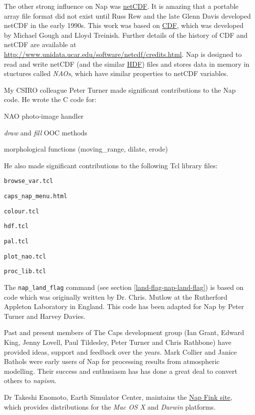 The other strong influence on Nap was 
  \href{http://www.unidata.ucar.edu/packages/netcdf/index.html}{netCDF}.
  It is amazing that a portable array file format did not exist until
  Russ Rew and the late Glenn Davis developed netCDF in the early
  1990s. This work was based on 
  \href{http://nssdc.gsfc.nasa.gov/cdf/cdf-home.html}{CDF}, which
  was developed by Michael Gough and Lloyd Treinish. 
Further details of the history of CDF and netCDF are available at
\\
\href{http://www.unidata.ucar.edu/software/netcdf/credits.html}
{http://www.unidata.ucar.edu/software/netcdf/credits.html}.
Nap is designed to
  read and write netCDF (and the similar 
  \href{http://hdf.ncsa.uiuc.edu}{HDF}) files and stores data in
  memory in stuctures called 
  \textit{NAOs}, which have similar properties to netCDF variables.
  \par
    My CSIRO colleague Peter Turner made significant
  contributions to the Nap code. He wrote the C code for:
\begin{bullets}
    \item NAO photo-image handler
    \item 
    \textit{draw} and 
    \textit{fill} OOC methods
    \item morphological functions (moving\_range, dilate, erode)
\end{bullets}
He also made significant contributions to the following Tcl
  library files:
\begin{bullets}
    \item 
      \texttt{browse\_var.tcl}
    \item 
      \texttt{caps\_nap\_menu.html}
    \item 
      \texttt{colour.tcl}
    \item 
      \texttt{hdf.tcl}
    \item 
      \texttt{pal.tcl}
    \item 
      \texttt{plot\_nao.tcl}
    \item 
      \texttt{proc\_lib.tcl}
\end{bullets}

The \texttt{nap\_land\_flag} command 
(see section \ref{land-flag-nap-land-flag})
is based on code which was originally written by Dr.
  Chris. Mutlow at the Rutherford Appleton Laboratory in England. This
  code has been adapted for Nap by Peter Turner and Harvey Davies.
  \par Past and present members of The Caps development group (Ian Grant,
  Edward King, Jenny Lovell, Paul Tildesley, Peter Turner and Chris
  Rathbone) have provided ideas, support and feedback over the years.
  Mark Collier and Janice Bathols were early users of Nap for
  processing results from atmospheric modelling. Their success and
  enthusiasm has has done a great deal to convert others to 
  \textit{napism}. 
  \par Dr Takeshi Enomoto, Earth Simulator Center, maintains the 
  \href{http://fink.sourceforge.net/pdb/package.php/nap}{Nap Fink site}, which provides distributions for the 
  \textit{Mac OS X} and 
  \textit{Darwin} platforms.
